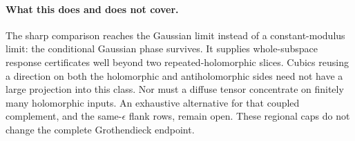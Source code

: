 \paragraph{What this does and does not cover.}
The sharp comparison reaches the Gaussian limit instead of a
constant-modulus limit: the conditional Gaussian phase survives.
It supplies whole-subspace response certificates well beyond two
repeated-holomorphic slices. Cubics reusing a direction on both the
holomorphic and antiholomorphic sides need not have a large projection
into this class. Nor must a diffuse tensor concentrate on finitely many
holomorphic inputs. An exhaustive alternative for that coupled
complement, and the same-$\epsilon$ flank rows, remain open. These
regional caps do not change the complete Grothendieck endpoint.
